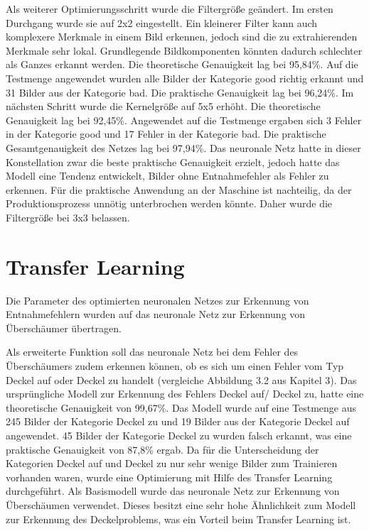 Als weiterer Optimierungsschritt wurde die Filtergröße geändert. Im ersten Durchgang
wurde sie auf 2x2 eingestellt. Ein kleinerer Filter kann auch komplexere Merkmale in 
einem Bild erkennen, jedoch sind die zu extrahierenden Merkmale sehr lokal. Grundlegende
Bildkomponenten könnten dadurch schlechter als Ganzes erkannt werden. Die theoretische 
Genauigkeit lag bei 95,84\%. Auf die Testmenge angewendet wurden alle Bilder der
Kategorie good richtig erkannt und 31 Bilder aus der Kategorie bad. Die praktische 
Genauigkeit lag bei 96,24\%. Im nächsten Schritt wurde die Kernelgröße auf 5x5 erhöht. Die
theoretische Genauigkeit lag bei 92,45\%. Angewendet auf die Testmenge ergaben sich 3
Fehler in der Kategorie good und 17 Fehler in der Kategorie bad. Die praktische 
Gesamtgenauigkeit des Netzes lag bei 97,94\%. Das neuronale Netz hatte in dieser 
Konstellation zwar die beste praktische Genauigkeit erzielt, jedoch hatte das Modell 
eine Tendenz entwickelt, Bilder ohne Entnahmefehler als Fehler zu erkennen. Für die praktische Anwendung
an der Maschine ist nachteilig, da der Produktionsprozess unnötig unterbrochen werden
könnte. Daher wurde die Filtergröße bei 3x3 belassen.

\section{Transfer Learning}

Die Parameter des optimierten neuronalen Netzes zur Erkennung von Entnahmefehlern
wurden auf das neuronale Netz zur Erkennung von Überschäumer übertragen.

Als erweiterte Funktion soll das neuronale Netz bei dem Fehler des
Überschäumers zudem erkennen können, ob es sich um einen Fehler vom Typ Deckel auf oder 
Deckel zu handelt (vergleiche Abbildung 3.2 aus Kapitel 3). Das ursprüngliche Modell zur 
Erkennung des Fehlers Deckel auf/ Deckel zu, hatte eine theoretische Genauigkeit von 
99,67\%. Das Modell wurde auf eine Testmenge aus 245 Bilder der Kategorie Deckel zu 
und 19 Bilder aus der Kategorie Deckel auf angewendet. 45 Bilder der Kategorie Deckel 
zu wurden falsch erkannt, was eine praktische Genauigkeit von 87,8\% ergab. 
Da für die Unterscheidung der Kategorien Deckel auf und Deckel zu nur sehr wenige 
Bilder zum Trainieren vorhanden waren, wurde eine Optimierung mit Hilfe des 
Transfer Learning durchgeführt. Als Basismodell wurde das neuronale Netz zur 
Erkennung von Überschäumen verwendet. Dieses besitzt eine sehr hohe
Ähnlichkeit zum Modell zur Erkennung des Deckelproblems, was
ein Vorteil beim Transfer Learning ist.

